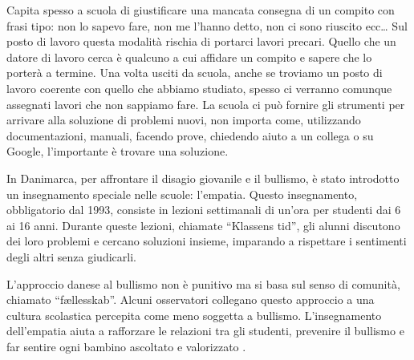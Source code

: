 \documentclass[12pt]{book} %
\begin{document}
Capita spesso a scuola di giustificare una mancata consegna di un compito con frasi tipo: non lo sapevo fare, non me
l'hanno detto, non ci sono riuscito ecc… Sul posto di lavoro questa modalità rischia di portarci lavori precari. Quello che un datore di lavoro cerca è qualcuno a cui affidare un compito e sapere che lo porterà a termine. Una
volta usciti da scuola, anche se troviamo un posto di lavoro coerente con
quello che abbiamo studiato, spesso ci verranno comunque assegnati lavori che non sappiamo fare. La scuola ci può fornire gli strumenti per
arrivare alla soluzione di problemi nuovi, non importa come, utilizzando documentazioni, manuali, facendo prove,
chiedendo aiuto a un collega o su Google, l'importante è trovare una soluzione. 

\begin{mdframed}[linewidth=1pt]
In Danimarca, per affrontare il disagio giovanile e il bullismo, è stato introdotto un insegnamento speciale nelle scuole: l’empatia. Questo insegnamento, obbligatorio dal 1993, consiste in lezioni settimanali di un’ora per studenti dai 6 ai 16 anni. Durante queste lezioni, chiamate “Klassens tid”, gli alunni discutono dei loro problemi e cercano soluzioni insieme, imparando a rispettare i sentimenti degli altri senza giudicarli.

L’approccio danese al bullismo non è punitivo ma si basa sul senso di comunità, chiamato “fællesskab”. Alcuni osservatori collegano questo approccio a una cultura scolastica percepita come meno soggetta a bullismo. L’insegnamento dell’empatia aiuta a rafforzare le relazioni tra gli studenti, prevenire il bullismo e far sentire ogni bambino ascoltato e valorizzato    .
\end{mdframed}
\end{document}
